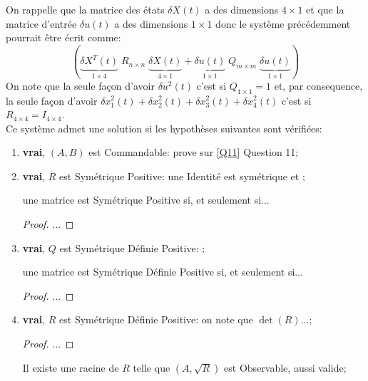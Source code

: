 \documentclass[class=article, crop=false]{standalone}
\begin{document}
\begin{resolution}
    On rappelle que la matrice des états $\delta X(t)$ a des dimensions $4\times 1$ et que la matrice d'entrée $\delta u(t)$ a des dimensions $1\times 1$ donc le système précédemment pourrait être écrit comme:
    \begin{equation*}
        ( 
            \underbrace{\delta X^T(t)}_{1\times 4}
            \; 
            {R}_{n\times n}
            \;
            \underbrace{\delta X(t)}_{4\times 1}
            + 
            \underbrace{\delta u(t)}_{1\times 1}
            \;
            {Q}_{m\times m}
            \;
            \underbrace{\delta u(t)}_{1\times 1}
        )
    \end{equation*}
    On note que la seule façon d'avoir $\delta u^2(t)$ c'est si $Q_{1\times 1} = 1$ et, par consequence, la seule façon d'avoir $\delta x^2_1(t) + \delta x^2_2(t) + \delta x^2_3(t) + \delta x^2_4(t)$ c'est si $R_{4\times 4} = I_{4\times 4}$.\\

    Ce système admet une solution si les hypothèses suivantes sont vérifiées:
    \begin{enumerate}[rightmargin = \leftmargin]
        \item \textbf{vrai}, $(A, B)$ est Commandable: prove sur \ref{Q11} Question 11;
        
        \item \textbf{vrai}, $R$ est Symétrique Positive: une Identité est symétrique et ;
        \begin{definition}
            une matrice est Symétrique Positive si, et seulement si...
        \end{definition}
        \begin{proof}
            ...
        \end{proof}

        \item \textbf{vrai}, $Q$ est Symétrique Définie Positive: ;
        \begin{definition}
            une matrice est Symétrique Définie Positive si, et seulement si...
        \end{definition}
        \begin{proof}
            ...
        \end{proof}

        \item \textbf{vrai}, $R$ est Symétrique Définie Positive: on note que $\det(R)$...;
        \begin{proof}
            ...
        \end{proof}
        \begin{remark}
            Il existe une racine de $R$ telle que $(A, \sqrt{R})$ est Observable, aussi valide;
        \end{remark}
    \end{enumerate}

\end{resolution}
\end{document}
